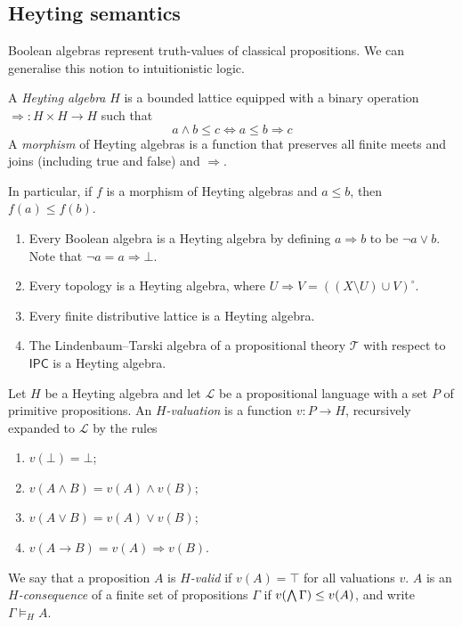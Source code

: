 \subsection{Heyting semantics}
Boolean algebras represent truth-values of classical propositions.
We can generalise this notion to intuitionistic logic.
\begin{definition}
    A \emph{Heyting algebra} \( H \) is a bounded lattice equipped with a binary operation \( \Rightarrow : H \times H \to H \) such that
    \[ a \wedge b \leq c \iff a \leq b \Rightarrow c \]
    A \emph{morphism} of Heyting algebras is a function that preserves all finite meets and joins (including true and false) and \( \Rightarrow \).
\end{definition}
In particular, if \( f \) is a morphism of Heyting algebras and \( a \leq b \), then \( f(a) \leq f(b) \).
\begin{example}
    \begin{enumerate}
        \item Every Boolean algebra is a Heyting algebra by defining \( a \Rightarrow b \) to be \( \neg a \vee b \).
        Note that \( \neg a = a \Rightarrow \bot \).
        \item Every topology is a Heyting algebra, where \( U \Rightarrow V = ((X \setminus U) \cup V)^\circ \).
        \item Every finite distributive lattice is a Heyting algebra.
        \item The Lindenbaum--Tarski algebra of a propositional theory \( \mathcal T \) with respect to \( \mathsf{IPC} \) is a Heyting algebra.
    \end{enumerate}
\end{example}
\begin{definition}
    Let \( H \) be a Heyting algebra and let \( \mathcal L \) be a propositional language with a set \( P \) of primitive propositions.
    An \emph{\( H \)-valuation} is a function \( v : P \to H \), recursively expanded to \( \mathcal L \) by the rules
    \begin{enumerate}
        \item \( v(\bot) = \bot \);
        \item \( v(A \wedge B) = v(A) \wedge v(B) \);
        \item \( v(A \vee B) = v(A) \vee v(B) \);
        \item \( v(A \to B) = v(A) \Rightarrow v(B) \).
    \end{enumerate}
    We say that a proposition \( A \) is \emph{\( H \)-valid} if \( v(A) = \top \) for all valuations \( v \).
    \( A \) is an \emph{\( H \)-consequence} of a finite set of propositions \( \Gamma \) if \( v\qty(\bigwedge \Gamma) \leq v(A) \), and write \( \Gamma \vDash_H A \).
\end{definition}
